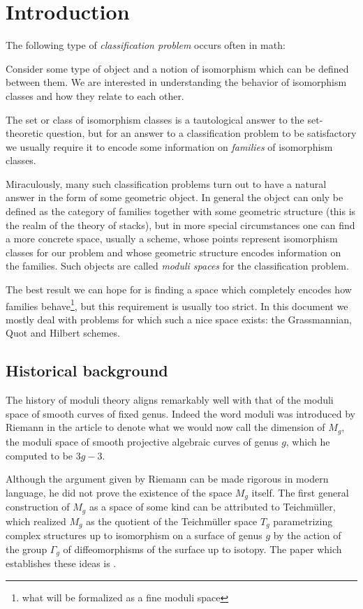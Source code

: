 \chapter{Introduction}
The following type of \textit{classification problem} occurs often in math:
\begin{center}
Consider some type of object and a notion of isomorphism which can be defined between them. We are interested in understanding the behavior of isomorphism classes and how they relate to each other.
\end{center}
The set or class of isomorphism classes is a tautological answer to the set-theoretic question, but for an answer to a classification problem to be satisfactory we usually require it to encode some information on \textit{families} of isomorphism classes.\medskip

Miraculously, many such classification problems turn out to have a natural answer in the form of some geometric object. 
In general the object can only be defined as the category of families together with some geometric structure (this is the realm of the theory of stacks), but in more special circumstances one can find a more concrete space, usually a scheme, whose points represent isomorphism classes for our problem and whose geometric structure encodes information on the families. 
Such objects are called \textit{moduli spaces} for the classification problem.\medskip

The best result we can hope for is finding a space which completely encodes how families behave\footnote{what will be formalized as a fine moduli space}, but this requirement is usually too strict.
In this document we mostly deal with problems for which such a nice space exists: the Grassmannian, Quot and Hilbert schemes.


\section*{Historical background}
The history of moduli theory aligns remarkably well with that of the moduli space of smooth curves of fixed genus. Indeed the word moduli was introduced by Riemann in the article \cite{riemann54theorie} to denote what we would now call the dimension of $M_g$, the moduli space of smooth projective algebraic curves of genus $g$, which he computed to be $3g-3$. 

Although the argument given by Riemann can be made rigorous in modern language, he did not prove the existence of the space $M_g$ itself.
The first general construction of $M_g$ as a space of some kind can be attributed to Teichm\"uller, which realized $M_g$ as the quotient of the Teichm\"uller space $T_g$ parametrizing complex structures up to isomorphism on a surface of genus $g$ by the action of the group $\Gamma_g$ of diffeomorphisms of the surface up to isotopy. The paper which establishes these ideas is \cite{teichmuller1939extremale}.


